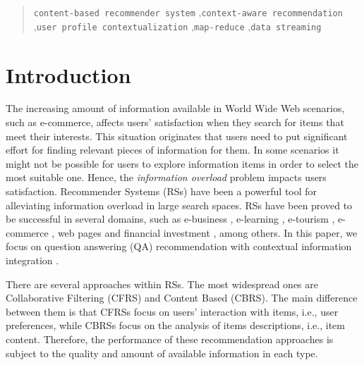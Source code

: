 \documentclass[preprint]{elsarticle}
\begin{document}
\begin{spacing}{1.5}
\begin{frontmatter}
\begin{abstract}
\begin{keyword}
   \texttt{content-based recommender system} \sep \texttt{context-aware recommendation} \sep \texttt{user profile contextualization} \sep \texttt{map-reduce} \sep \texttt{data streaming}
\end{keyword}
\end{abstract}

\end{frontmatter}

\section{Introduction}\label{sec:introduction}

The increasing amount of information available in World Wide Web scenarios, such as e-commerce, affects users' satisfaction when they search for items that meet their interests. This situation originates that users need to put significant effort for finding relevant pieces of information for them. In some scenarios it might not be possible for users to explore information items in order to select the most suitable one. Hence, the \emph{information overload} problem impacts users satisfaction. Recommender Systems (RSs) have been a powerful tool for alleviating information overload in large search spaces. RSs have been proved to be successful in several domains, such as e-business \cite{Lu2013}, e-learning \cite{Wu2015,Yera2014}, e-tourism \cite{AlHassan2015,Noguera2012}, e-commerce \cite{Rafailidis2016}, web pages \cite{Nguyen2014,Xuan2015} and financial investment \cite{Musto2015}, among others. In this paper, we focus on question answering (QA) recommendation with contextual information integration \cite{Kuchmann2015}.




There are several approaches within RSs. The most widespread ones are Collaborative Filtering (CFRS) and Content Based (CBRS). The main difference between them is that CFRSs focus on users' interaction with items, i.e., user preferences, while CBRSs focus on the analysis of items descriptions, i.e., item content. Therefore, the performance of these recommendation approaches is subject to the quality and amount of available information in each type.


\end{spacing}
\end{document}
